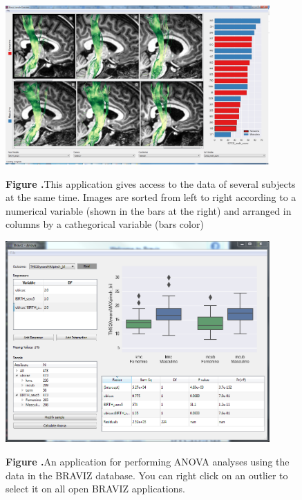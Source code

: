 \documentclass[utf8]{frontiersSCNS} %
\begin{document}
\begin{figure}[h!]
\begin{center}
\includegraphics[width=0.9\textwidth]{figures/sample_overview.PNG}
\end{center}
 \textbf{\label{fig_sample} Figure .}{This application gives access to the data of several subjects at the same time. Images are sorted from left to right according to a numerical variable (shown in the bars at the right) and arranged in columns by a cathegorical variable (bars color)  }
\end{figure}

\begin{figure}[h!]
\begin{center}
\includegraphics[width=0.9\textwidth]{figures/anova.PNG}
\end{center}
 \textbf{\label{fig_anova} Figure .}{An application for performing ANOVA analyses using the data in the BRAVIZ database. You can right click on an outlier to select it on all open BRAVIZ applications. }
\end{figure}
\end{document}
